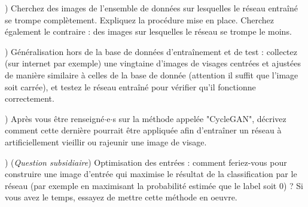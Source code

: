 \documentclass[a4paper,11pt]{article}
\begin{document}
) Cherchez des images de l'ensemble de données sur lesquelles le réseau entraîné se trompe complètement. Expliquez la procédure mise en place. Cherchez également le contraire : des images sur lesquelles le réseau se trompe le moins.
\newline

) Généralisation hors de la base de données d'entraînement et de test : collectez (sur internet par exemple) une vingtaine d'images de visages centrées et ajustées de manière similaire à celles de la base de donnée (attention il suffit que l'image soit carrée), et testez le réseau entraîné pour vérifier qu'il fonctionne correctement.
\newline

) Après vous être renseigné$\cdot$e$\cdot$s sur la méthode appelée "CycleGAN", décrivez comment cette dernière pourrait être appliquée afin d'entraîner un réseau à artificiellement vieillir ou rajeunir une image de visage.
\newline 

) (\emph{Question subsidiaire}) Optimisation des entrées : comment feriez-vous pour construire une image d'entrée qui maximise le résultat de la classification par le réseau (par exemple en maximisant la probabilité estimée que le label soit 0) ? Si vous avez le temps, essayez de mettre cette méthode en oeuvre.
\end{document}
